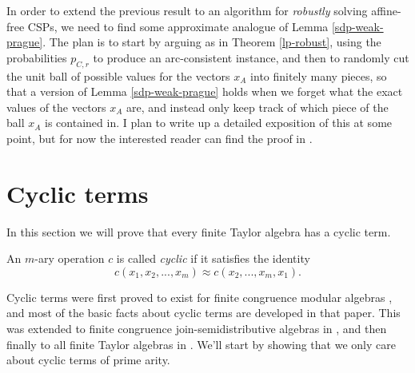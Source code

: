 \documentclass[letterpaper,11pt]{article}
\begin{document}
In order to extend the previous result to an algorithm for \emph{robustly} solving affine-free CSPs, we need to find some approximate analogue of Lemma \ref{sdp-weak-prague}. The plan is to start by arguing as in Theorem \ref{lp-robust}, using the probabilities $p_{C,r}$ to produce an arc-consistent instance, and then to randomly cut the unit ball of possible values for the vectors $x_A$ into finitely many pieces, so that a version of Lemma \ref{sdp-weak-prague} holds when we forget what the exact values of the vectors $x_A$ are, and instead only keep track of which piece of the ball $x_A$ is contained in. I plan to write up a detailed exposition of this at some point, but for now the interested reader can find the proof in \cite{sdp}.%



\section{Cyclic terms}

In this section we will prove that every finite Taylor algebra has a cyclic term.

\begin{defn} An $m$-ary operation $c$ is called \emph{cyclic} if it satisfies the identity
\[
c(x_1, x_2, ..., x_m) \approx c(x_2, ..., x_m, x_1).
\]
\end{defn}

Cyclic terms were first proved to exist for finite congruence modular algebras \cite{congruence-modular-cyclic}, and most of the basic facts about cyclic terms are developed in that paper. This was extended to finite congruence join-semidistributive algebras in \cite{sd-join-cyclic}, and then finally to all finite Taylor algebras in \cite{cyclic}. We'll start by showing that we only care about cyclic terms of prime arity.
\end{document}
